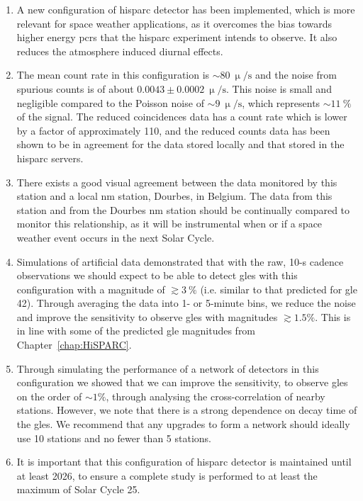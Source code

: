 \begin{enumerate}
	\item{A new configuration of \gls{hisparc} detector has been implemented, which is more relevant for space weather applications, as it overcomes the bias towards higher energy \glspl{pcr} that the \gls{hisparc} experiment intends to observe. It also reduces the atmosphere induced diurnal effects.}%

	\item{The mean count rate in this configuration is $\sim80~\upmu/\mathrm{s}$ and the noise from spurious counts is of about $0.0043\pm0.0002~\upmu/\mathrm{s}$. This noise is small and negligible compared to the Poisson noise of $\sim9~\upmu/\mathrm{s}$, which represents $\sim11~\%$ of the signal. The reduced coincidences data has a count rate which is lower by a factor of approximately 110, and the reduced counts data has been shown to be in agreement for the data stored locally and that stored in the \gls{hisparc} servers.}
	
	\item{There exists a good visual agreement between the data monitored by this station and a local \gls{nm} station, Dourbes, in Belgium. The data from this station and from the Dourbes \gls{nm} station should be continually compared to monitor this relationship, as it will be instrumental when or if a space weather event occurs in the next Solar Cycle.}
	
	\item{Simulations of artificial data demonstrated that with the raw, 10-s cadence observations we should expect to be able to detect \glspl{gle} with this configuration with a magnitude of $\gtrsim3~\%$ (i.e. similar to that predicted for \gls{gle} 42). Through averaging the data into 1- or 5-minute bins, we reduce the noise and improve the sensitivity to observe \glspl{gle} with magnitudes $\gtrsim1.5 \%$. This is in line with some of the predicted \gls{gle} magnitudes from Chapter~\ref{chap:HiSPARC}.}
	
	\item{Through simulating the performance of a network of detectors in this configuration we showed that we can improve the sensitivity, to observe \glspl{gle} on the order of $\sim 1 \%$, through analysing the cross-correlation of nearby stations. However, we note that there is a strong dependence on decay time of the \glspl{gle}. We recommend that any upgrades to form a network should ideally use 10 stations and no fewer than 5 stations.}
	
	\item{It is important that this configuration of \gls{hisparc} detector is maintained until at least 2026, to ensure a complete study is performed to at least the maximum of Solar Cycle 25.}
\end{enumerate}